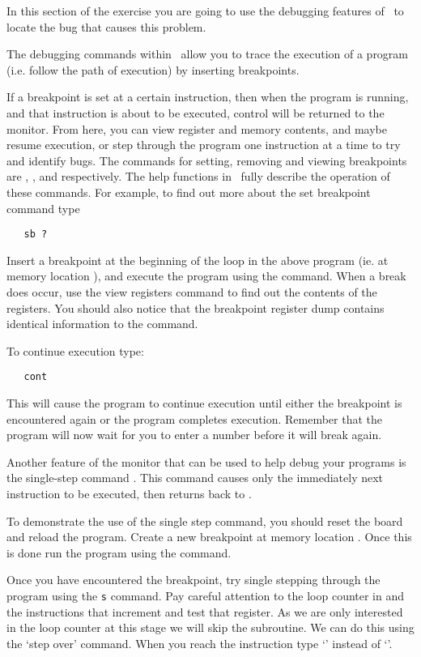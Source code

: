 In this section of the exercise you are going to use the debugging 
features of \WRAMPmon\ to locate the bug that causes this problem.

The debugging commands within \WRAMPmon\ allow you to trace the execution 
of a program (i.e. follow the path of execution) by inserting breakpoints.

If a breakpoint is set at a certain instruction, then when the program
is running, and that instruction is about to be executed, control will
be returned to the monitor. From here, you can view register and
memory contents, and maybe resume execution, or step through the
program one instruction at a time to try and identify bugs. The
commands for setting, removing and viewing breakpoints are ,
, and  respectively. The help functions in \WRAMPmon\
fully describe the operation of these commands. For example, to find
out more about the set breakpoint command type
\begin{verbatim}
   sb ?
\end{verbatim}

Insert a breakpoint at the beginning of the loop in the above program 
(ie. at memory location \src{0x00004}), and execute the program using
the \src{go} command.
When a break does occur, use the view registers command to find out the 
contents of the registers. You should also notice that the breakpoint 
register dump contains identical information to the \src{vr} command.

To continue execution type:
\begin{verbatim}
   cont
\end{verbatim}
This will cause the program to continue execution until either the
breakpoint is encountered again or the program completes execution.
Remember that the program will now wait for you to enter a number
before it will break again.

Another feature of the monitor that can be used to help debug your programs
is the single-step command \src{s}. This command causes only the
immediately next instruction to be executed, then returns back to
\WRAMPmon.

To demonstrate the use of the single step command, you should reset the
board and reload the program. Create a new breakpoint at memory location
\src{0x00005}. Once this is done run the program using the \src{go}
command.

Once you have encountered the breakpoint, try single stepping through
the program using the \verb|s| command. Pay careful attention to the
loop counter in \reg{5} and the instructions that increment and test
that register. As we are only interested in the loop counter at this
stage we will skip the \src{readnum} subroutine. We can do this using
the `step over'  command. When you reach the instruction \src{jal
readnum} type `\src{so}' instead of `\src{s}'.

